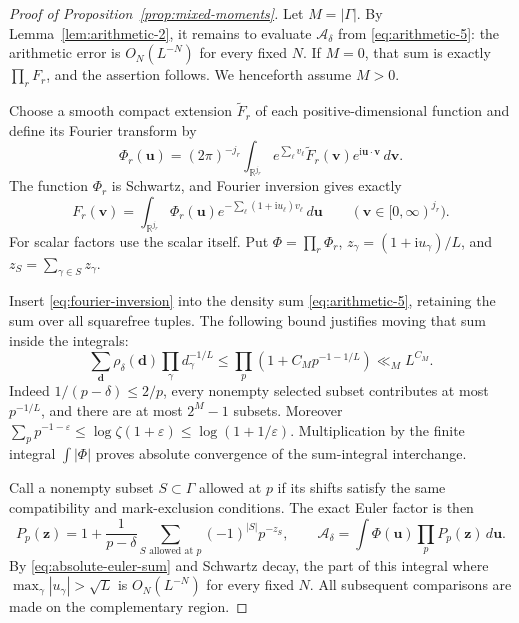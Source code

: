 \begin{proof}[Proof of Proposition~\ref{prop:mixed-moments}]
Let $M=|\Gamma|$. By Lemma~\ref{lem:arithmetic-2}, it remains to
evaluate $\mathcal A_\delta$ from \eqref{eq:arithmetic-5}: the arithmetic
error is $O_N(L^{-N})$ for every fixed $N$.
If $M=0$, that sum is exactly $\prod_rF_r$, and the assertion follows.
We henceforth assume $M>0$.

Choose a smooth compact extension $\widetilde F_r$ of each positive-dimensional
function and define its Fourier transform by
\[
 \Phi_r(\mathbf u)=(2\pi)^{-j_r}\int_{\mathbb R^{j_r}}
 e^{\sum_\ell v_\ell}\widetilde F_r(\mathbf v)
 e^{\mathrm i\mathbf u\cdot\mathbf v}\,d\mathbf v.
\]
The function $\Phi_r$ is Schwartz, and Fourier inversion gives exactly
\begin{equation}\label{eq:fourier-inversion}
 F_r(\mathbf v)=\int_{\mathbb R^{j_r}}\Phi_r(\mathbf u)
 e^{-\sum_\ell(1+\mathrm i u_\ell)v_\ell}\,d\mathbf u
 \qquad(\mathbf v\in[0,\infty)^{j_r}).
\end{equation}
For scalar factors use the scalar itself. Put $\Phi=\prod_r\Phi_r$,
$z_\gamma=(1+\mathrm i u_\gamma)/L$, and
$z_S=\sum_{\gamma\in S}z_\gamma$.

Insert \eqref{eq:fourier-inversion} into the density sum
\eqref{eq:arithmetic-5}, retaining the sum over all squarefree tuples.
The following bound justifies moving that sum inside the integrals:
\begin{equation}\label{eq:absolute-euler-sum}
 \sum_{\mathbf d}\rho_\delta(\mathbf d)\prod_\gamma d_\gamma^{-1/L}
 \le\prod_p(1+C_Mp^{-1-1/L})\ll_M L^{C_M}.
\end{equation}
Indeed $1/(p-\delta)\le2/p$, every nonempty selected subset contributes at
most $p^{-1/L}$, and there are at most $2^M-1$ subsets. Moreover
$\sum_pp^{-1-\varepsilon}\le\log\zeta(1+\varepsilon)
\le\log(1+1/\varepsilon)$. Multiplication by the finite integral
$\int|\Phi|$ proves absolute convergence of the sum-integral interchange.

Call a nonempty subset $S\subset\Gamma$ allowed at $p$ if its shifts satisfy
the same compatibility and mark-exclusion conditions. The exact Euler factor
is then
\[
 P_p(\mathbf z)=1+\frac1{p-\delta}
 \sum_{S\text{ allowed at }p}(-1)^{|S|}p^{-z_S},
 \qquad
 \mathcal A_\delta=\int\Phi(\mathbf u)\prod_pP_p(\mathbf z)\,d\mathbf u.
\]
By \eqref{eq:absolute-euler-sum} and Schwartz decay, the part of this integral
where $\max_\gamma|u_\gamma|>\sqrt L$ is $O_N(L^{-N})$ for every fixed $N$.
All subsequent comparisons are made on the complementary region.


\end{proof}
